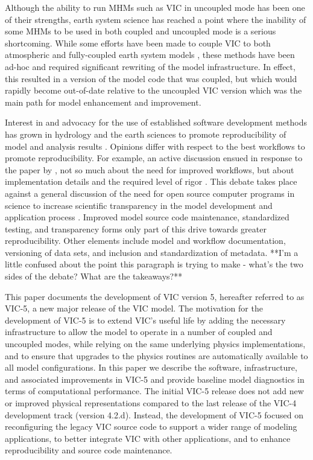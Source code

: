 \documentclass[gmd, manuscript]{copernicus}
\begin{document}
  Although the ability to run MHMs such as VIC in uncoupled mode has been one of their strengths, earth system science has reached a point where the inability of some MHMs to be used in both coupled and uncoupled mode is a serious shortcoming. While some efforts have been made to couple VIC to both atmospheric and fully-coupled earth system models \citep[e.g.][]{Zhu_2009,Hamman_2016a}, these methods have been ad-hoc and required significant rewriting of the model infrastructure. In effect, this resulted in a version of the model code that was coupled, but which would rapidly become out-of-date relative to the uncoupled VIC version which was the main path for model enhancement and improvement.

  Interest in and advocacy for the use of established software development methods has grown in hydrology and the earth sciences to promote reproducibility of model and analysis results \citep[e.g.][]{Ceola_2015,Fienen_2016,Gil_2016,Hutton_2016}. Opinions differ with respect to the best workflows to promote reproducibility. For example, an active discussion ensued in response to the paper by \citet{Hutton_2016}, not so much about the need for improved workflows, but about implementation details and the required level of rigor \citep{Anel_2017,Melsen_2017,Hut_2017,Hutton_2017a,Hutton_2017b}. This debate takes place against a general discussion of the need for open source computer programs in science to increase scientific transparency in the model development and application process \citep{Ince_2012}. Improved model source code maintenance, standardized testing, and transparency forms only part of this drive towards greater reproducibility. Other elements include model and workflow documentation, versioning of data sets, and inclusion and standardization of metadata. **I'm a little confused about the point this paragraph is trying to make - what's the two sides of the debate? What are the takeaways?**

  This paper documents the development of VIC version 5, hereafter referred to as VIC-5, a new major release of the VIC model. The motivation for the development of VIC-5 is to extend VIC's useful life by adding the necessary infrastructure to allow the model to operate in a number of coupled and uncoupled modes, while relying on the same underlying physics implementations, and to ensure that upgrades to the physics routines are automatically available to all model configurations. In this paper we describe the software, infrastructure, and associated improvements in VIC-5 and provide baseline model diagnostics in terms of computational performance. The initial VIC-5 release does not add new or improved physical representations compared to the last release of the VIC-4 development track (version 4.2.d). Instead, the development of VIC-5 focused on reconfiguring the legacy VIC source code to support a wider range of modeling applications, to better integrate VIC with other applications, and to enhance reproducibility and source code maintenance.
\end{document}
